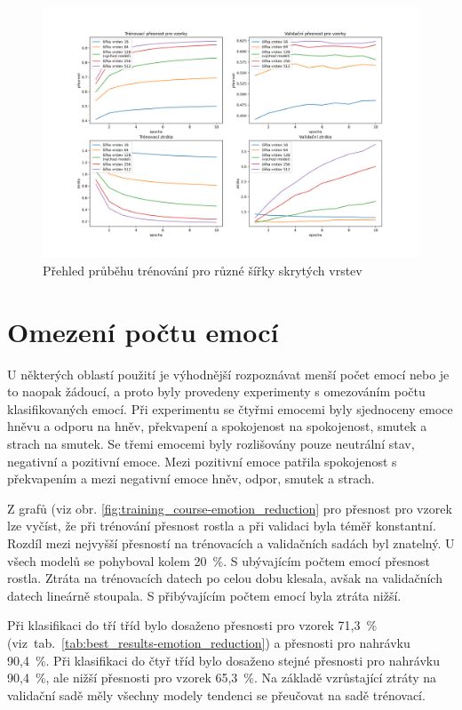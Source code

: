 \documentclass[FM,BP]{tulthesis}
\begin{document}
\begin{figure}[!htbp]
\centerline{\includegraphics[scale=.5]{training_course-width.png}}
\caption{Přehled průběhu trénování pro různé šířky skrytých vrstev}
\label{fig:training_course-width}
\end{figure}
\FloatBarrier

\section{Omezení počtu emocí} %
U některých oblastí použití je výhodnější rozpoznávat menší počet emocí nebo je to naopak žádoucí, a proto byly provedeny experimenty s omezováním počtu klasifikovaných emocí. Při experimentu se čtyřmi emocemi byly sjednoceny emoce hněvu a odporu na hněv, překvapení a spokojenost na spokojenost, smutek a strach na smutek. Se třemi emocemi byly rozlišovány pouze neutrální stav, negativní a pozitivní emoce. Mezi pozitivní emoce patřila spokojenost s překvapením a mezi negativní emoce hněv, odpor, smutek a strach.

Z grafů (viz obr. \mbox{\ref{fig:training_course-emotion_reduction}} pro přesnost pro vzorek lze vyčíst, že při trénování přesnost rostla a při validaci byla téměř konstantní. Rozdíl mezi nejvyšší přesností na trénovacích a validačních sadách byl znatelný. U všech modelů se pohyboval kolem \mbox{20 \%}. S ubývajícím počtem emocí přesnost rostla. Ztráta na trénovacích datech po celou dobu klesala, avšak na validačních datech lineárně stoupala. S přibývajícím počtem emocí byla ztráta nižší.

Při klasifikaci do tří tříd bylo dosaženo přesnosti pro vzorek \mbox{71,3 \%} \mbox{(viz tab. \ref{tab:best_results-emotion_reduction})} a přesnosti pro nahrávku \mbox{90,4 \%}. Při klasifikaci do čtyř tříd bylo dosaženo stejné přesnosti pro nahrávku \mbox{90,4 \%}, ale nižší přesnosti pro vzorek \mbox{65,3 \%}. Na základě vzrůstající ztráty na validační sadě měly všechny modely tendenci se přeučovat na sadě trénovací.
\end{document}
